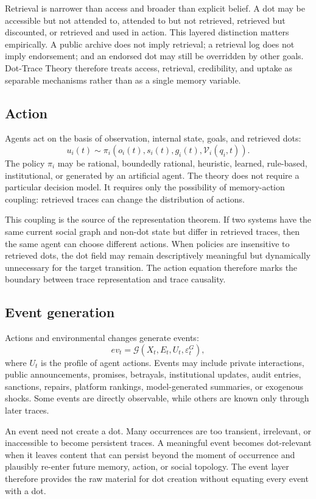\documentclass[11pt]{article}
\theoremstyle{remark}
\begin{document}
Retrieval is narrower than access and broader than explicit belief. A dot may be accessible but not attended to, attended to but not retrieved, retrieved but discounted, or retrieved and used in action. This layered distinction matters empirically. A public archive does not imply retrieval; a retrieval log does not imply endorsement; and an endorsed dot may still be overridden by other goals. Dot-Trace Theory therefore treats access, retrieval, credibility, and uptake as separable mechanisms rather than as a single memory variable.

\subsection{Action}\label{action}

Agents act on the basis of observation, internal state, goals, and retrieved dots:
\[
u_i(t)\sim \pi_i(o_i(t),s_i(t),g_i(t),\mathcal V_i(q_i,t)).
\]
The policy $\pi_i$ may be rational, boundedly rational, heuristic, learned, rule-based, institutional, or generated by an artificial agent. The theory does not require a particular decision model. It requires only the possibility of memory-action coupling: retrieved traces can change the distribution of actions.

This coupling is the source of the representation theorem. If two systems have the same current social graph and non-dot state but differ in retrieved traces, then the same agent can choose different actions. When policies are insensitive to retrieved dots, the dot field may remain descriptively meaningful but dynamically unnecessary for the target transition. The action equation therefore marks the boundary between trace representation and trace causality.

\subsection{Event generation}\label{event-generation}

Actions and environmental changes generate events:
\[
ev_t=\mathcal G(X_t,E_t,U_t,\varepsilon_t^G),
\]
where $U_t$ is the profile of agent actions. Events may include private interactions, public announcements, promises, betrayals, institutional updates, audit entries, sanctions, repairs, platform rankings, model-generated summaries, or exogenous shocks. Some events are directly observable, while others are known only through later traces.

An event need not create a dot. Many occurrences are too transient, irrelevant, or inaccessible to become persistent traces. A meaningful event becomes dot-relevant when it leaves content that can persist beyond the moment of occurrence and plausibly re-enter future memory, action, or social topology. The event layer therefore provides the raw material for dot creation without equating every event with a dot.
\end{document}
